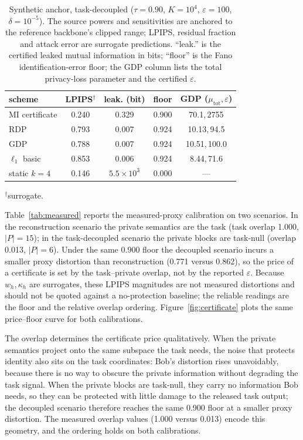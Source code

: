 \documentclass{ieeetj}
\theoremstyle{plain}
\theoremstyle{definition}
\begin{document}
\begin{table}[t]
\centering\footnotesize
\setlength{\tabcolsep}{3.5pt}
\caption{Synthetic anchor, task-decoupled ($\tau{=}0.90$, $K{=}10^{4}$,
$\varepsilon{=}100$, $\delta{=}10^{-5}$). The source powers and sensitivities
are anchored to the reference backbone's clipped range; LPIPS, residual
fraction and attack error are surrogate predictions. ``leak.'' is the certified
leaked mutual information in bits; ``floor'' is the Fano identification-error
floor; the GDP column lists the total privacy-loss parameter and the certified
$\varepsilon$.}
\label{tab:synthetic}
\begin{tabular}{lcccc}
\toprule
scheme & LPIPS$^\dagger$ & leak. (bit) & floor & GDP ($\mu_{\mathrm{tot}},\varepsilon$) \\
\midrule
MI certificate & 0.240 & 0.329 & 0.900 & 70.1,\,2755 \\
RDP & 0.793 & 0.007 & 0.924 & 10.13,\,94.5 \\
GDP & 0.788 & 0.007 & 0.924 & 10.51,\,100.0 \\
$\ell_1$ basic & 0.853 & 0.006 & 0.924 & 8.44,\,71.6 \\
static $k{=}4$ & 0.146 & $5.5\times10^{3}$ & 0.000 & --- \\
\bottomrule
\end{tabular}
$^\dagger$surrogate.
\end{table}

Table~\ref{tab:measured} reports the measured-proxy calibration on two
scenarios. In the reconstruction scenario the private semantics are the task
(task overlap 1.000, $|P|=15$); in the task-decoupled scenario the private
blocks are task-null (overlap 0.013, $|P|=6$). Under the same 0.900 floor the
decoupled scenario incurs a smaller proxy distortion than reconstruction
(0.771 versus 0.862), so the price of a certificate is set by the
task--private overlap, not by the reported $\varepsilon$. Because $w_h,\kappa_h$
are surrogates, these LPIPS magnitudes are not measured distortions and should
not be quoted against a no-protection baseline; the reliable readings are the
floor and the relative overlap ordering. Figure~\ref{fig:certificate}
plots the same price--floor curve for both calibrations.

The overlap determines the certificate price qualitatively. When the private
semantics project onto the same subspace the task needs, the noise that
protects identity also sits on the task coordinates: Bob's distortion rises
unavoidably, because there is no way to obscure the private information without
degrading the task signal. When the private blocks are task-null, they carry
no information Bob needs, so they can be protected with little damage to the
released task output; the decoupled scenario therefore reaches the same
0.900 floor at a smaller proxy distortion. The measured overlap values
(1.000 versus 0.013) encode this geometry, and the ordering holds on both
calibrations.
\end{document}
